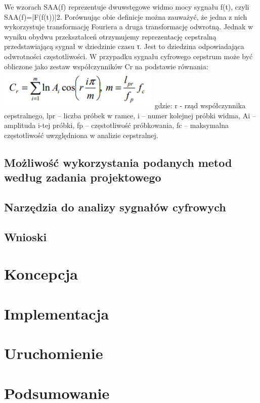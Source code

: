 \documentclass[a4paper,titleauthor]{mwart}
\begin{document}
We wzorach SAA(f) reprezentuje dwuwstęgowe widmo mocy sygnału f(t), czyli SAA(f)=|F(f(t))|2. Porównując obie definicje można zauważyć, że jedna z nich wykorzystuje transformację Fouriera a druga transformację odwrotną. Jednak w wyniku obydwu przekształceń otrzymujemy reprezentację cepstralną przedstawiającą sygnał w dziedzinie czasu τ. Jest to dziedzina odpowiadająca odwrotności częstotliwości.
W przypadku sygnału cyfrowego cepstrum może być obliczone jako zestaw współczynników Cr na podstawie równania: \newline
	\includegraphics[width=0.3 \textwidth]{Acepstrum2.png}
gdzie: r - rząd współczynnika cepstralnego, lpr – liczba próbek w ramce, i – numer kolejnej próbki widma, Ai – amplituda i-tej próbki, fp – częstotliwość próbkowania, fc – maksymalna częstotliwość uwzględniona w analizie cepstralnej.


\subsection{Możliwość wykorzystania podanych metod według zadania projektowego}

\subsection{Narzędzia do analizy sygnałów cyfrowych}

\subsection{Wnioski}

\section{Koncepcja}
\label{sec:koncepcja}

\section{Implementacja}
\label{sec:implementacja}


\section{Uruchomienie}
\label{sec:uruchomienie}


\section{Podsumowanie}
\label{sec:podsumowanie}
\end{document}

